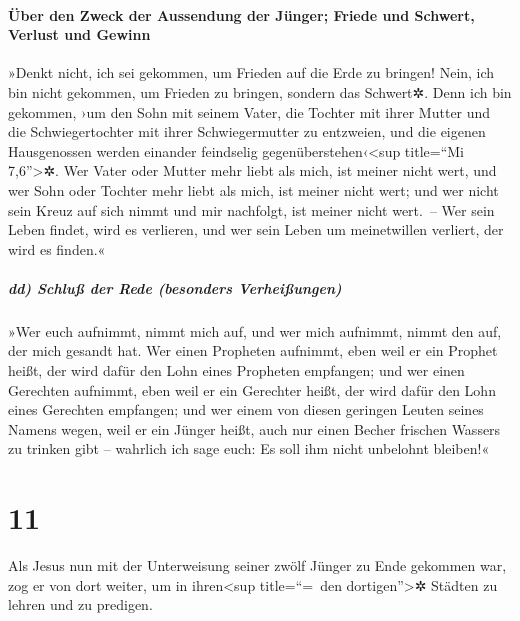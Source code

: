 \hypertarget{uxfcber-den-zweck-der-aussendung-der-juxfcnger-friede-und-schwert-verlust-und-gewinn}{%
\paragraph{Über den Zweck der Aussendung der Jünger; Friede und Schwert,
Verlust und
Gewinn}\label{uxfcber-den-zweck-der-aussendung-der-juxfcnger-friede-und-schwert-verlust-und-gewinn}}

 »Denkt nicht, ich sei gekommen, um Frieden auf die Erde
zu bringen! Nein, ich bin nicht gekommen, um Frieden zu bringen, sondern
das Schwert✲.  Denn ich bin gekommen, ›um den Sohn mit
seinem Vater, die Tochter mit ihrer Mutter und die Schwiegertochter mit
ihrer Schwiegermutter zu entzweien,  und die eigenen
Hausgenossen werden einander feindselig gegenüberstehen‹\textless sup
title=``Mi 7,6''\textgreater✲.  Wer Vater oder Mutter
mehr liebt als mich, ist meiner nicht wert, und wer Sohn oder Tochter
mehr liebt als mich, ist meiner nicht wert;  und wer
nicht sein Kreuz auf sich nimmt und mir nachfolgt, ist meiner nicht
wert.~--  Wer sein Leben findet, wird es verlieren, und
wer sein Leben um meinetwillen verliert, der wird es finden.«

\hypertarget{dd-schluuxdf-der-rede-besonders-verheiuxdfungen}{%
\subparagraph{dd) Schluß der Rede (besonders
Verheißungen)}\label{dd-schluuxdf-der-rede-besonders-verheiuxdfungen}}

 »Wer euch aufnimmt, nimmt mich auf, und wer mich
aufnimmt, nimmt den auf, der mich gesandt hat.  Wer einen
Propheten aufnimmt, eben weil er ein Prophet heißt, der wird dafür den
Lohn eines Propheten empfangen; und wer einen Gerechten aufnimmt, eben
weil er ein Gerechter heißt, der wird dafür den Lohn eines Gerechten
empfangen;  und wer einem von diesen geringen Leuten
seines Namens wegen, weil er ein Jünger heißt, auch nur einen Becher
frischen Wassers zu trinken gibt -- wahrlich ich sage euch: Es soll ihm
nicht unbelohnt bleiben!«

\hypertarget{section-10}{%
\section{11}\label{section-10}}

 Als Jesus nun mit der Unterweisung seiner zwölf Jünger zu
Ende gekommen war, zog er von dort weiter, um in ihren\textless sup
title=``=~den dortigen''\textgreater✲ Städten zu lehren und zu predigen.

